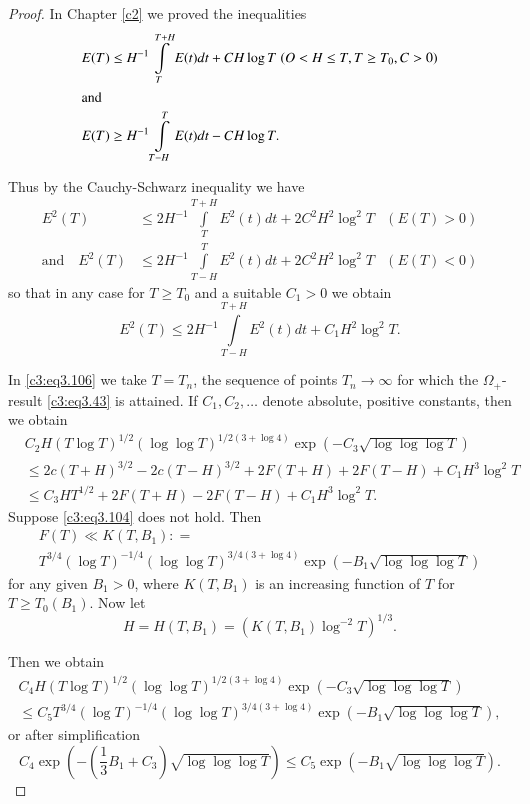 \begin{proof}
  In Chapter \ref{c2} we proved the inequalities
  \begin{align*}
    E(T) & \leq H^{-1} \int\limits_T^{T+H}E(t) dt + CH \log T \; (O < H
    \leq T, T\geq T_0, C>0)\\
    \intertext{and}
    E(T) & \geq H^{-1} \int\limits_{T-H}^T E(t) dt - CH \log T.
  \end{align*}

  Thus by the Cauchy-Schwarz inequality we have
  \begin{eqnarray*}
    E^2 (T) & \leq  2 H^{-1} \int\limits_T^{T+H} E^2 (t) dt + 2C^2 H^2
    \log^2 T &(E(T) > 0)\\
    \text{and}\quad 
    E^2 (T) & \leq 2H^{-1} \int\limits_{T-H}^T E^2 (t) dt + 2C^2 H^2
    \log^2 T & (E(T)< 0)
  \end{eqnarray*}
  so that in any case for $T \geq T_0$ and a suitable $C_1 > 0$ we
  obtain 
  \begin{equation}
    E^2 (T) \leq 2 H^{-1} \int\limits_{T-H}^{T+H} E^2 (t) dt + C_1 H^2
    \log^2 T.\label{c3:eq3.106}
  \end{equation}

In \eqref{c3:eq3.106} we take $T= T_n$, the sequence of points $T_n\to
\infty$  for which the $\Omega_+$-result \eqref{c3:eq3.43} is
attained. If $C_1, C_2, \ldots$ denote absolute,\pageoriginale
positive constants, then we obtain 
{\fontsize{10}{12}\selectfont
\begin{align*}
  & C_2 H(T \log T)^{1/2} (\log \log T)^{1/2 (3 + \log 4)} \exp \left( -
  C_3 \sqrt{\log \log \log T}\right)\\
  & \leq 2c (T+ H)^{3/2} - 2c (T-H)^{3/2} + 2F(T+H) + 2F (T-H) + C_1 H^3 \log^2
  T\\
  & \leq C_3 HT^{1/2} + 2F (T+H) - 2F (T-H) + C_1 H^3 \log^2 T.
\end{align*}}
\indent
Suppose \eqref{c3:eq3.104} does not hold. Then 
\begin{multline*}
  F(T) \ll K(T, B_1): =\\
T^{3/4} (\log T)^{-1/4} (\log \log T)^{3/4 (3 +
    \log 4)} \exp \left(-B_1 \sqrt{\log \log \log T} \right)
\end{multline*}
for any given $B_1> 0$, where $K(T, B_1)$ is an increasing function of
$T$ for $T\geq T_0 (B_1)$. Now let
$$
H= H(T, B_1)= (K(T, B_1)\log^{-2}T)^{1/3}.
$$

Then we obtain
\begin{multline*}
  C_4 H(T\log T)^{1/2} (\log \log T)^{1/2(3 + \log 4)} \exp \left(-C_3
  \sqrt{\log \log \log T}\right)\\
  \leq C_5 T^{3/4} (\log T)^{-1/4} (\log \log T)^{3/4 (3 + \log 4)}
  \exp \left( -B_1 \sqrt{\log \log \log T}\right),
\end{multline*}
or after simplification
$$
C_4 \exp \left( - \left(\frac{1}{3} B_1 + C_3 \right) \sqrt{\log \log
  \log T}\right) \leq C_5 \exp \left(- B_1 \sqrt{\log \log \log T} \right).
$$


\end{proof}
